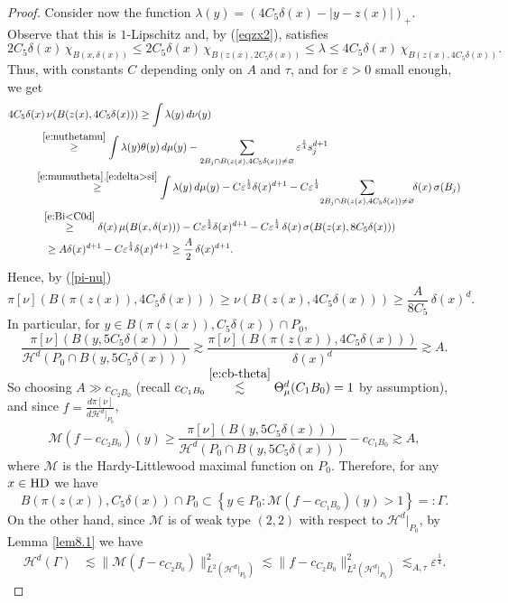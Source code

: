 \documentclass[11pt]{amsart}
\newcommand{\HH}{{\mathcal H}}
\newcommand{\rf}[1]{{(\ref{#1})}}
\newcommand{\ve}{{\varepsilon}}
\newcommand{\HD}{{\mathsf{HD}}}
\theoremstyle{definition}
\theoremstyle{remark}
\def\HD{{\rm HD}}
\numberwithin{equation}{section}
\def\cH{{\mathcal{H}}}
\def\cM{{\mathcal{M}}}
\newcommand{\ps}[1]{\left( #1 \right)}
\newcommand{\ck}[1]{\left\{#1 \right\}}
\def\lec{\lesssim}
\def\lec{\lesssim}
\begin{document}
\begin{proof}
Consider now the function 
$\lambda(y) = (4C_5\delta(x)-|y-z(x)|)_{+}$. Observe that this is $1$-Lipschitz and, by \rf{eqzx2}, satisfies
$$2C_5\delta(x)\,\chi_{B(x,\delta(x))}\leq 2C_5\delta(x)\,\chi_{B(z(x),2C_5\delta(x))} \leq\lambda\leq 4C_5\delta(x)\,\chi_{B(z(x),4C_5\delta(x))}.$$
Thus, with constants $C$ depending only on $A$ and $\tau$, and for $\ve>0$ small enough, we get
\begin{align*}
4C_5\delta(x)  &\,\nu(B(z(x),4C_5\delta(x)))
 \geq \int \lambda(y)\,d\nu(y)\\
&\!\!\! \stackrel{\eqref{e:nuthetamu}}{\geq} \int\lambda(y)\theta(y) \,d\mu(y) -\sum_{2B_{j}\cap B(z(x),4C_5\delta(x))\neq\varnothing} \ve^{\frac14} s_{j}^{d+1}\\
& \!\!\!\!\!\! \stackrel{\eqref{e:mumutheta},\eqref{e:delta>si}}{\geq} \int \lambda(y)\,d\mu(y) - C\ve^{\frac{1}{2}} \delta(x)^{d+1} - C\ve^{\frac14} \!\sum_{2B_{j}\cap B(z(x),4C_5\delta(x))\neq\varnothing} \!\! \delta(x)\,\sigma(B_{j})\\
& \!\!\stackrel{\eqref{e:Bi<C0d}}{\geq} \delta(x)\, \mu(B(x,\delta(x))) -C\ve^{\frac{1}{2}} \delta (x)^{d+1} -  C\ve^{\frac14}\, \delta(x) \,\sigma( B(z(x),8C_5\delta(x)))\\
& \geq A\delta(x)^{d+1} - C\ve^{\frac{1}{4}} \delta(x)^{d+1}
\geq \frac{A}{2}\,\delta(x)^{d+1} .
\end{align*}
Hence, by \rf{pi-nu}
\[
\pi[\nu](B(\pi(z(x)),4C_5\delta(x))) \geq \nu(B(z(x),4C_5\delta(x)))
\geq \frac{A}{8C_5}\, \delta(x)^{d}. 
\]
In particular, for $y\in B(\pi(z(x)),C_5\delta(x))\cap P_{0}$,
\[
\frac{\pi[\nu](B(y,5C_5\delta(x)))}{\cH^{d}(P_{0}\cap B(y,5C_5\delta(x)))}
\gtrsim \frac{\pi[\nu](B(\pi(z(x)),4C_5\delta(x)))}{\delta(x)^{d}}
\gtrsim A.\]
So choosing $A\gg c_{C_{2}B_{0}}$ (recall $c_{C_{1}B_{0}} \stackrel{\eqref{e:cb-theta}}{\lec}  \Theta^d_{\mu}(C_{1}B_{0}) =1$ by assumption), and since  $f=\frac{d\pi[\nu]}{d\cH^{d}|_{P_{0}}} $,
\[
\cM\ps{f - c_{C_{2}B_{0}}}(y)
\geq \frac{\pi[\nu](B(y,5C_5\delta(x)))}{\cH^{d}(P_{0}\cap B(y,5C_5\delta(x)))} -c_{C_{1}B_{0}}
\gtrsim A,
\]
where $\cM$ is the Hardy-Littlewood maximal function on $P_{0}$. Therefore, for any $x\in\HD$ we have
\begin{equation*}
B(\pi(z(x)),C_5\delta(x))\cap P_0\subset \ck{y\in P_0: \cM\ps{f - c_{C_{1}B_{0}}}(y) >1}=:\Gamma.
\end{equation*}
On the other hand, since $\cM$ is of weak type $(2,2)$ with respect to $\HH^d|_{P_0}$, by Lemma \ref{lem8.1} we have
\begin{align}\label{e:pib-Lambda}
\HH^d(\Gamma) &\lesssim \|\cM(f-c_{C_{2}B_{0}})\|_{L^{2}(\HH^d|_{P_0})}^{2} \lesssim \|f-c_{C_{2}B_{0}}\|_{L^{2}(\HH^d|_{P_0})}^{2}
 \lec_{A,\tau}  \ve^{\frac{1}{4}}.
 \end{align}


\end{proof}
\end{document}

